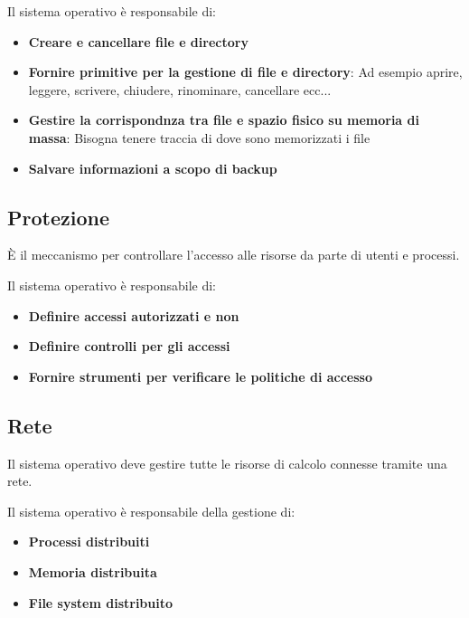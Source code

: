 \documentclass[a4paper]{article}
\begin{document}
\vspace{1em}
\noindent
Il sistema operativo è responsabile di:
\begin{itemize}
  \item \textbf{Creare e cancellare file e directory}

  \item \textbf{Fornire primitive per la gestione di file e directory}: Ad esempio
    aprire, leggere, scrivere, chiudere, rinominare, cancellare ecc...

  \item \textbf{Gestire la corrispondnza tra file e spazio fisico su memoria di massa}:
    Bisogna tenere traccia di dove sono memorizzati i file

  \item \textbf{Salvare informazioni a scopo di backup}
\end{itemize}

\subsection{Protezione}
È il meccanismo per controllare l'accesso alle risorse da parte di utenti e processi.

\vspace{1em}
\noindent
Il sistema operativo è responsabile di:
\begin{itemize}
  \item \textbf{Definire accessi autorizzati e non}

  \item \textbf{Definire controlli per gli accessi}

  \item \textbf{Fornire strumenti per verificare le politiche di accesso}
\end{itemize}

\subsection{Rete}
Il sistema operativo deve gestire tutte le risorse di calcolo connesse tramite una rete.

\vspace{1em}
\noindent
Il sistema operativo è responsabile della gestione di:
\begin{itemize}
  \item \textbf{Processi distribuiti}
  \item \textbf{Memoria distribuita}
  \item \textbf{File system distribuito}
\end{itemize}
\end{document}
